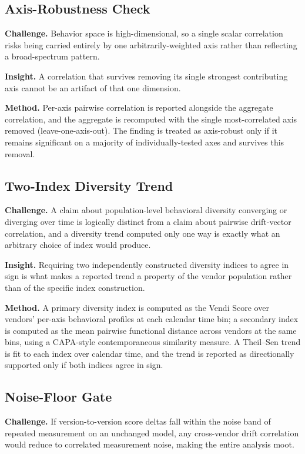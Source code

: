 \documentclass[11pt]{article}
\begin{document}
\subsection{Axis-Robustness Check}
\textbf{Challenge.} Behavior space is high-dimensional, so a single scalar correlation risks being carried entirely by one arbitrarily-weighted axis rather than reflecting a broad-spectrum pattern.

\textbf{Insight.} A correlation that survives removing its single strongest contributing axis cannot be an artifact of that one dimension.

\textbf{Method.} Per-axis pairwise correlation is reported alongside the aggregate correlation, and the aggregate is recomputed with the single most-correlated axis removed (leave-one-axis-out). The finding is treated as axis-robust only if it remains significant on a majority of individually-tested axes and survives this removal.

\subsection{Two-Index Diversity Trend}
\textbf{Challenge.} A claim about population-level behavioral diversity converging or diverging over time is logically distinct from a claim about pairwise drift-vector correlation, and a diversity trend computed only one way is exactly what an arbitrary choice of index would produce.

\textbf{Insight.} Requiring two independently constructed diversity indices to agree in sign is what makes a reported trend a property of the vendor population rather than of the specific index construction.

\textbf{Method.} A primary diversity index is computed as the Vendi Score \citep{VendiScore} over vendors' per-axis behavioral profiles at each calendar time bin; a secondary index is computed as the mean pairwise functional distance across vendors at the same bins, using a CAPA-style contemporaneous similarity measure. A Theil--Sen trend is fit to each index over calendar time, and the trend is reported as directionally supported only if both indices agree in sign.

\subsection{Noise-Floor Gate}
\textbf{Challenge.} If version-to-version score deltas fall within the noise band of repeated measurement on an unchanged model, any cross-vendor drift correlation would reduce to correlated measurement noise, making the entire analysis moot.
\end{document}
